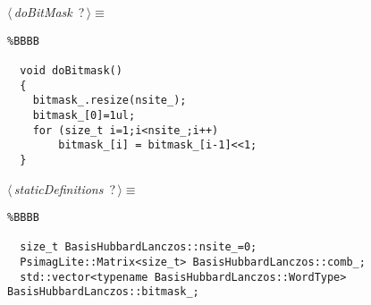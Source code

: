 \documentclass{report}
\begin{document}
\begin{flushleft} \small
\begin{minipage}{\linewidth}\label{scrap15}\raggedright\small
{} $\langle\,${\it doBitMask}\nobreak\ {\footnotesize {?}}$\,\rangle\equiv$
\begin{lstlisting}%BBBB
    
  void doBitmask()  
  {  
  	bitmask_.resize(nsite_);  
  	bitmask_[0]=1ul;  
  	for (size_t i=1;i<nsite_;i++)  
  		bitmask_[i] = bitmask_[i-1]<<1;  
  }  \end{lstlisting}
\end{minipage}\vspace{4ex}
\end{flushleft}
\begin{flushleft} \small
\begin{minipage}{\linewidth}\label{scrap16}\raggedright\small
{} $\langle\,${\it staticDefinitions}\nobreak\ {\footnotesize {?}}$\,\rangle\equiv$
\begin{lstlisting}%BBBB
    
  size_t BasisHubbardLanczos::nsite_=0;  
  PsimagLite::Matrix<size_t> BasisHubbardLanczos::comb_;  
  std::vector<typename BasisHubbardLanczos::WordType> BasisHubbardLanczos::bitmask_;  \end{lstlisting}
\end{minipage}\vspace{4ex}
\end{flushleft}
\end{document}
